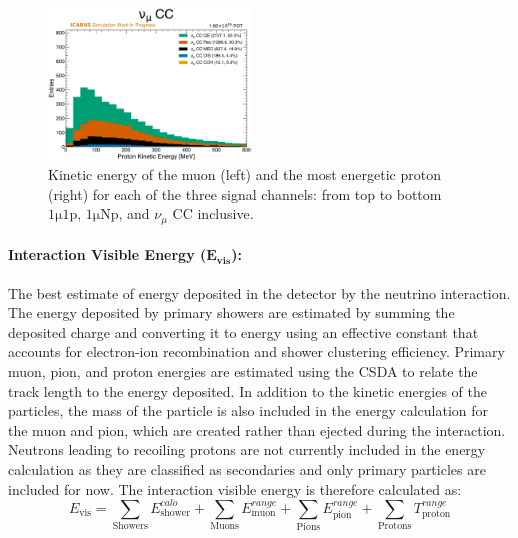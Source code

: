 \begin{figure}[!htb]
    \includegraphics[width=0.48\textwidth]{figures/neutrino_selection/signal_hist1d_1muX_proton_ke.pdf}
    \caption{Kinetic energy of the muon (left) and the most energetic proton (right) for each of the three signal channels: from top to bottom $\mathrm{1\mu 1p}$, $\mathrm{1\mu Np}$, and $\nu_\mu$ CC inclusive.}
    \label{fig:muon_proton_ke}
\end{figure}

\paragraph{Interaction Visible Energy ($\mathbf{E_{vis}}$):}
The best estimate of energy deposited in the detector by the neutrino interaction. The energy deposited by primary showers are estimated by summing the deposited charge and converting it to energy using an effective constant that accounts for electron-ion recombination and shower clustering efficiency. Primary muon, pion, and proton energies are estimated using the CSDA to relate the track length to the energy deposited. In addition to the kinetic energies of the particles, the mass of the particle is also included in the energy calculation for the muon and pion, which are created rather than ejected during the interaction. Neutrons leading to recoiling protons are not currently included in the energy calculation as they are classified as secondaries and only primary particles are included for now. The interaction visible energy is therefore calculated as:
\begin{equation}
    E_{\text{vis}} = \sum_{\mathrm{Showers}} E^{calo}_{\mathrm{shower}} + \sum_{\mathrm{Muons}} E^{range}_{\mathrm{muon}} + \sum_{\mathrm{Pions}} E^{range}_{\mathrm{pion}} + \sum_{\mathrm{Protons}} T^{range}_{\mathrm{proton}}
\end{equation}

